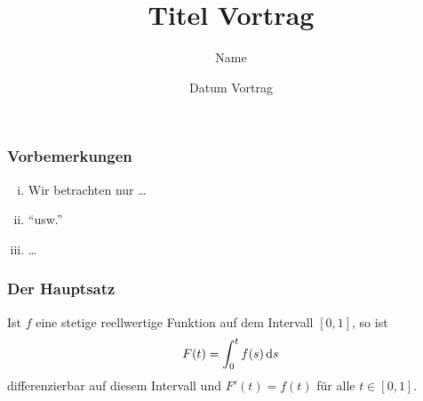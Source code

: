 \documentclass[%
	,ngerman
	,hyperref={%
		,bookmarks
		,colorlinks=true
		,citecolor=blue
		,linkcolor=blue
		,urlcolor=blue
			}
	,smaller
	]{beamer}
\begin{document}
%
\title{Titel Vortrag}
\author{Name}
\date{Datum Vortrag} 

\frame{\titlepage}

\begin{frame} 		
	\frametitle{Vorbemerkungen}
	
	\begin{enumerate}[(i)]
		\item 
		Wir betrachten nur \ldots
		
		\item
		\enquote{usw.}
		
		\item
		\ldots
		
	\end{enumerate}
\end{frame}
\begin{frame}
	\frametitle{Der Hauptsatz}

\begin{theorem}\label{prop:hauptsatz}
	
Ist $ f $ eine stetige reellwertige Funktion auf dem Intervall $ \left[ 0,1 \right] $, so ist
%
\[
  	F( t ) = \int_{ 0 }^{ t } f(s) \mathop{}\!\mathrm{d}{s}
\]
%
differenzierbar auf diesem Intervall und $ F'(t) = f(t) $ für alle $ t \in \left[ 0,1 \right] $.
\end{theorem}

\end{frame}
\end{document}
